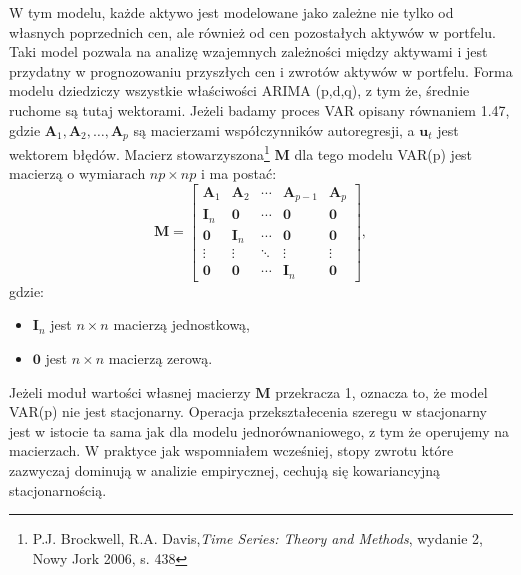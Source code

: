 \begin{enumerate}
W tym modelu, każde aktywo jest modelowane jako zależne nie tylko od własnych poprzednich cen, ale również od cen pozostałych aktywów w portfelu. Taki model pozwala na analizę wzajemnych zależności między aktywami i jest przydatny w prognozowaniu przyszłych cen i zwrotów aktywów w portfelu. Forma modelu dziedziczy wszystkie właściwości ARIMA (p,d,q), z tym że, średnie ruchome są tutaj wektorami. Jeżeli badamy proces VAR opisany równaniem 1.47, gdzie \( \mathbf{A}_1, \mathbf{A}_2, \ldots, \mathbf{A}_p \) są macierzami współczynników autoregresji, a \( \mathbf{u}_t \) jest wektorem błędów. Macierz stowarzyszona\footnote{P.J. Brockwell, R.A. Davis,\textit{Time Series: Theory and Methods}, wydanie 2, Nowy Jork 2006, s. 438} \( \mathbf{M} \) dla tego modelu VAR(p) jest macierzą o wymiarach \( np \times np \) i ma postać:
\begin{equation}
\mathbf{M} = 
\begin{bmatrix}
\mathbf{A}_1 & \mathbf{A}_2 & \cdots & \mathbf{A}_{p-1} & \mathbf{A}_p \\
\mathbf{I}_n & \mathbf{0} & \cdots & \mathbf{0} & \mathbf{0} \\
\mathbf{0} & \mathbf{I}_n & \cdots & \mathbf{0} & \mathbf{0} \\
\vdots  & \vdots  & \ddots & \vdots  & \vdots  \\
\mathbf{0} & \mathbf{0} & \cdots & \mathbf{I}_n & \mathbf{0}
\end{bmatrix},
\end{equation}
gdzie:
\begin{itemize}
  \item \( \mathbf{I}_n \) jest \( n \times n \) macierzą jednostkową,
  \item \( \mathbf{0} \) jest \( n \times n \) macierzą zerową.
\end{itemize}
Jeżeli moduł wartości własnej macierzy \( \mathbf{M} \) przekracza 1, oznacza to, że model VAR(p) nie jest stacjonarny. Operacja przekształecenia szeregu w stacjonarny jest w istocie ta sama jak dla modelu jednorównaniowego, z tym że operujemy na macierzach. W praktyce jak wspomniałem wcześniej, stopy zwrotu które zazwyczaj dominują w analizie empirycznej, cechują się kowariancyjną stacjonarnością.


\end{enumerate}
